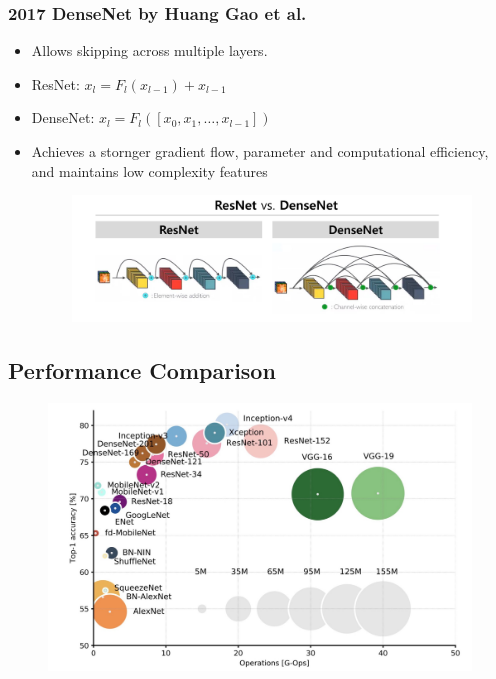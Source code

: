 \subsubsection{2017 DenseNet by Huang Gao et al.}
\begin{itemize}
    \item Allows skipping across multiple layers.
    \item ResNet: \( x_l = F_l(x_{l-1}) + x_{l-1} \)
    \item DenseNet: \( x_l = F_l([x_0, x_1, \ldots, x_{l-1}]) \)
    \item Achieves a stornger gradient flow, parameter and computational efficiency, and maintains low complexity features

\begin{figure}[H]
    \centering
    \includegraphics[width=0.75\linewidth]{img/densenet_resnet.png}
    
    
\end{figure}

\end{itemize}

\subsection{Performance Comparison}
\begin{figure}[H]
    \centering
    \includegraphics[width=0.8\linewidth]{img/cnn_performance.png}
    
    
\end{figure}

